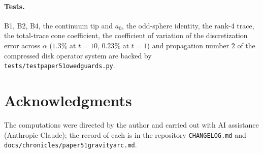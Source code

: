 \documentclass[11pt,a4paper]{article}
\theoremstyle{plain}
\theoremstyle{definition}
\renewcommand{\_}{\textunderscore\allowbreak}
\begin{document}
\paragraph{Tests.} B1, B2, B4, the continuum tip and $a_0$, the
odd-sphere identity, the rank-4 trace, the total-trace cone coefficient,
the coefficient of variation of the discretization error across $\alpha$
($1.3\%$ at $t=10$, $0.23\%$ at $t=1$) and propagation number $2$ of the
compressed disk operator system are backed by
\texttt{tests/test\_paper51\_owed\_guards.py}.

\section*{Acknowledgments}

The computations were directed by the author and carried out with
AI assistance (Anthropic Claude); the record of each is in the repository
\texttt{CHANGELOG.md} and \texttt{docs/chronicles/paper51\_gravity\_arc.md}.
\end{document}
